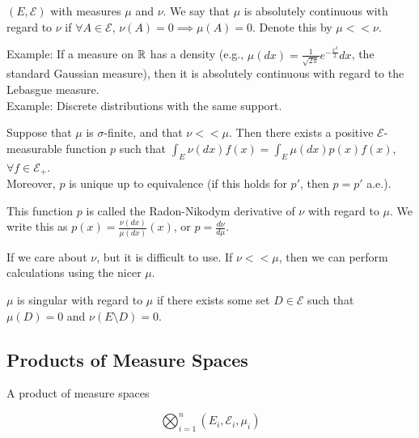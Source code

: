 \documentclass[12pt, titlepage]{article}
\begin{document}
\begin{dfn}{}
	$(E, \mathcal{E})$ with measures $\mu$ and $\nu$. We say that $\mu$ is absolutely continuous with regard to $\nu$ if $\forall A \in \mathcal{E}$, $\nu(A) = 0 \implies \mu(A) = 0$. Denote this by $\mu << \nu$.
\end{dfn}

Example: If a measure on $\mathbb{R}$ has a density (e.g., $\mu(dx) = \frac{1}{\sqrt{2\pi}} e^{-\frac{x^2}{2}} dx$, the standard Gaussian measure), then it is absolutely continuous with regard to the Lebasgue measure.\\

Example: Discrete distributions with the same support.\\

\begin{theo}[]{}
	Suppose that $\mu$ is $\sigma$-finite, and that $\nu << \mu$. Then there exists a positive $\mathcal{E}$-measurable function $p$ such that $\int_E \nu(dx) f(x) = \int_E \mu(dx) p(x)f(x)$, $\forall f \in \mathcal{E}_+$.\\
	
	Moreover, $p$ is unique up to equivalence (if this holds for $p'$, then $p = p'$ a.e.).\\
\end{theo}

\begin{dfn}{}
	This function $p$ is called the Radon-Nikodym derivative of $\nu$ with regard to $\mu$. We write this as $p(x) = \frac{\nu(dx)}{\mu(dx)}(x)$, or $p = \frac{d\nu}{d\mu}$.\\
\end{dfn}

If we care about $\nu$, but it is difficult to use. If $\nu << \mu$, then we can perform calculations using the nicer $\mu$.\\

\begin{dfn}{}
	$\mu$ is singular with regard to $\mu$ if there exists some set $D \in \mathcal{E}$ such that $\mu(D) = 0$ and $\nu(E \setminus D) = 0$.
\end{dfn}

\subsection{Products of Measure Spaces}
A product of measure spaces 

\[\bigotimes_{i = 1}^n (E_i, \mathcal{E}_i, \mu_i)\]
\end{document}
